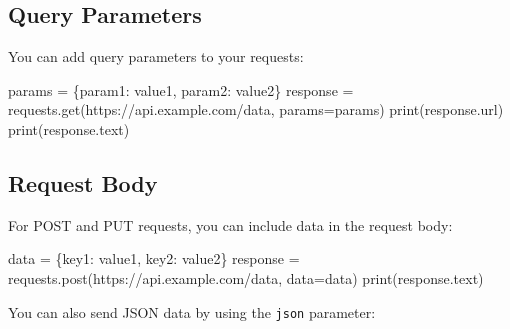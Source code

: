 \documentclass[
  letterpaper,
  DIV=11,
  numbers=noendperiod]{scrreprt}
\newenvironment{Shaded}{\begin{snugshade}}{\end{snugshade}}
\newcommand{\BuiltInTok}[1]{\textcolor[rgb]{0.00,0.23,0.31}{#1}}
\newcommand{\NormalTok}[1]{\textcolor[rgb]{0.00,0.23,0.31}{#1}}
\newcommand{\OperatorTok}[1]{\textcolor[rgb]{0.37,0.37,0.37}{#1}}
\newcommand{\StringTok}[1]{\textcolor[rgb]{0.13,0.47,0.30}{#1}}
\begin{document}
\subsection{Query Parameters}\label{query-parameters}

You can add query parameters to your requests:

\begin{Shaded}
\begin{Highlighting}[]
\NormalTok{params }\OperatorTok{=}\NormalTok{ \{}\StringTok{\textquotesingle{}param1\textquotesingle{}}\NormalTok{: }\StringTok{\textquotesingle{}value1\textquotesingle{}}\NormalTok{, }\StringTok{\textquotesingle{}param2\textquotesingle{}}\NormalTok{: }\StringTok{\textquotesingle{}value2\textquotesingle{}}\NormalTok{\}}
\NormalTok{response }\OperatorTok{=}\NormalTok{ requests.get(}\StringTok{\textquotesingle{}https://api.example.com/data\textquotesingle{}}\NormalTok{, params}\OperatorTok{=}\NormalTok{params)}
\BuiltInTok{print}\NormalTok{(response.url)}
\BuiltInTok{print}\NormalTok{(response.text)}
\end{Highlighting}
\end{Shaded}

\subsection{Request Body}\label{request-body}

For POST and PUT requests, you can include data in the request body:

\begin{Shaded}
\begin{Highlighting}[]
\NormalTok{data }\OperatorTok{=}\NormalTok{ \{}\StringTok{\textquotesingle{}key1\textquotesingle{}}\NormalTok{: }\StringTok{\textquotesingle{}value1\textquotesingle{}}\NormalTok{, }\StringTok{\textquotesingle{}key2\textquotesingle{}}\NormalTok{: }\StringTok{\textquotesingle{}value2\textquotesingle{}}\NormalTok{\}}
\NormalTok{response }\OperatorTok{=}\NormalTok{ requests.post(}\StringTok{\textquotesingle{}https://api.example.com/data\textquotesingle{}}\NormalTok{, data}\OperatorTok{=}\NormalTok{data)}
\BuiltInTok{print}\NormalTok{(response.text)}
\end{Highlighting}
\end{Shaded}

You can also send JSON data by using the \texttt{json} parameter:
\end{document}
